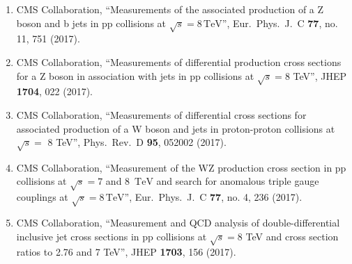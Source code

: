 \begin{itemize}
\begin{enumerate}
\item CMS Collaboration, ``Measurements of the associated production of a Z boson and b jets in pp collisions at ${\sqrt{s}} = 8\,\text {TeV} $'', Eur.\ Phys.\ J.\ C {\bf 77}, no. 11, 751 (2017).

\item CMS Collaboration, ``Measurements of differential production cross sections for a Z boson in association with jets in pp collisions at $ \sqrt{s}=8 $ TeV'', JHEP {\bf 1704}, 022 (2017).

\item CMS Collaboration, ``Measurements of differential cross sections for associated production of a W boson and jets in proton-proton collisions at $\sqrt{s} =$ 8 TeV'', Phys.\ Rev.\ D {\bf 95}, 052002 (2017).

\item CMS Collaboration, ``Measurement of the WZ production cross section in pp collisions at $\sqrt{s} = 7$ and 8 $\,\text{TeV}$ and search for anomalous triple gauge couplings at $\sqrt{s} = 8\,\text{TeV} $'', Eur.\ Phys.\ J.\ C {\bf 77}, no. 4, 236 (2017).

\item CMS Collaboration, ``Measurement and QCD analysis of double-differential inclusive jet cross sections in pp collisions at $ \sqrt{s}=8 $ TeV and cross section ratios to 2.76 and 7 TeV'', JHEP {\bf 1703}, 156 (2017).


\end{enumerate}
\end{itemize}
